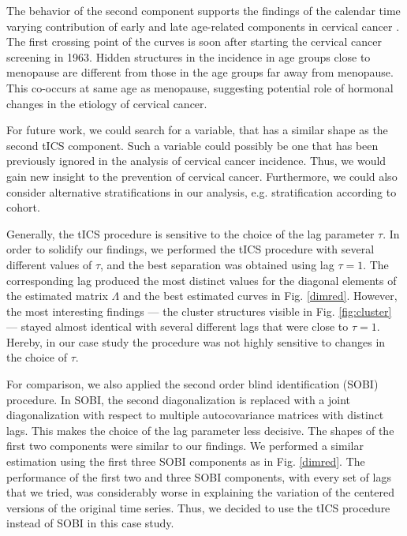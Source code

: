 \documentclass{llncs}
\begin{document}
 The behavior of the second component supports the findings  of the calendar time varying contribution of early and late age-related components in cervical cancer \cite{JP3} .  The first crossing point of the curves is soon after starting the cervical cancer screening in 1963. Hidden structures in the incidence in age groups close to menopause  are different from those in the age groups far away from menopause. This co-occurs at same age as menopause, suggesting potential role of hormonal changes in the etiology of cervical cancer. 
 
For future work, we could search for a variable, that has a similar shape as the second tICS component. Such a variable could possibly be one that has been previously ignored in the analysis of cervical cancer incidence. Thus, we would gain new insight to the prevention of cervical cancer.  Furthermore, we could also consider alternative stratifications in our analysis, e.g. stratification according to cohort.



Generally, the tICS procedure is sensitive to the choice of the lag parameter $\tau$. In order to solidify our findings, we performed the tICS procedure with several different values of $\tau$, and the best separation was obtained using lag $\tau=1$. The corresponding lag produced the most distinct values for the diagonal elements of the estimated matrix $\Lambda$ and the best estimated curves in Fig. \ref{dimred}. However, the most interesting findings --- the cluster structures visible in Fig. \ref{fig:cluster} --- stayed almost identical with several different  lags that were close to $\tau=1$. Hereby, in our case study the procedure  was not highly sensitive to changes in the choice of $\tau$. 

For comparison, we also applied the second order blind identification (SOBI) \cite{belouchrani1997} procedure. In SOBI, the second diagonalization is replaced with a joint diagonalization with respect to multiple autocovariance matrices with distinct lags. This makes the choice of the lag parameter less decisive. The shapes of the first two components were similar to our findings. We performed a similar estimation using the first three SOBI components as in Fig. \ref{dimred}. The performance of the first two and three SOBI components, with every set of lags that we tried, was considerably worse in explaining the variation of the centered versions of the original time series. Thus, we decided to use the tICS procedure instead of SOBI in this case study.
\end{document}

